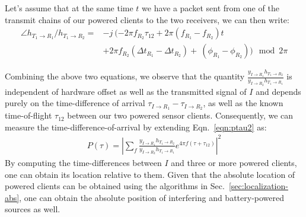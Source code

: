 Let's assume that at the same time $t$ we have a packet sent from one of the transmit chains of our powered clients to the two receivers, we can then write:
\begin{align*}
\angle h_{T_1 \rightarrow R_1} /  h_{T_1 \rightarrow R_2} = & -j~(- 2 \pi f_{R_2}\tau_{12} + 2 \pi (f_{R_1} - f_{R_2}) t \nonumber \\
& + 2 \pi f_{R_2} (\Delta t_{R_1} - \Delta t_{R_2})  +~(\phi_{R_1} - \phi_{R_2}) ) \mod 2\pi 
\end{align*}

Combining the above two equations, we observe that the quantity $\frac{y_{I \rightarrow R_1} h_{T_1 \rightarrow R_2}}{y_{I \rightarrow R_2} h_{T_1 \rightarrow R_1}}$ is independent of hardware offset as well as the transmitted signal of $I$ and depends purely on the time-difference of arrival $\tau_{I \rightarrow R_1} - \tau_{I \rightarrow R_2}$, as well as the known time-of-flight $\tau_{12}$ between our two powered sensor clients. Consequently, we can measure the time-difference-of-arrival by extending Eqn.~\ref{eqn:ptau2} as:
\begin{align}
P(\tau) = \left|\sum_f \frac{y_{I \rightarrow R_1} h_{T_1 \rightarrow R_2}}{y_{I \rightarrow R_2} h_{T_1 \rightarrow R_1}} e^{4 \pi f (\tau + \tau_{12}) }\right|^2 
\end{align}
By computing the time-differences between  $I$ and three or more powered clients, one can obtain its location relative to them. Given that the absolute location of powered clients can be obtained using the algorithms in Sec.~\ref{sec:localization-abs}, one can obtain the absolute position of  interfering and battery-powered sources as well.
